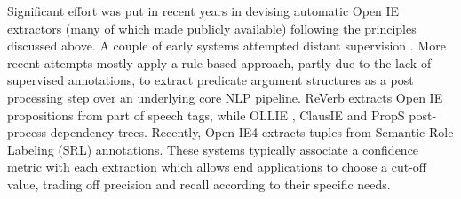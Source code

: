 Significant effort was put in recent years in devising automatic Open IE extractors (many of
which made publicly available) following the principles
discussed above.
A couple of  early systems attempted distant supervision \cite{wu2010open,banko2007open}.
More recent attempts mostly apply a rule based approach, partly due to the lack of supervised annotations,
to extract predicate argument structures
as a post processing step over an underlying core NLP pipeline.
ReVerb \cite{fader2011identifying} extracts Open IE propositions from part of speech tags, while
OLLIE \cite{mausam2012open}, ClausIE \cite{del2013clausie} and PropS \cite{props2016} post-process dependency trees.
Recently, Open IE4 extracts tuples from Semantic Role Labeling (SRL) annotations.
These systems typically associate a confidence metric with each extraction
which allows end applications to choose a cut-off value, trading off precision and recall according
to their specific needs.




